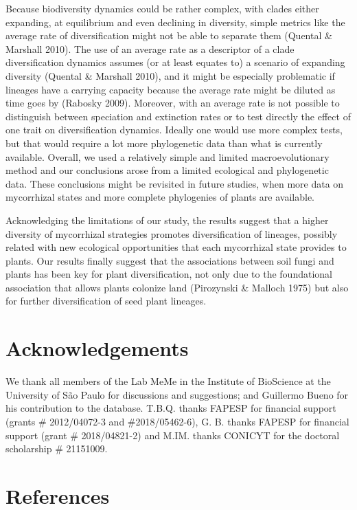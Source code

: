 \documentclass[12pt,]{article}
\begin{document}
Because biodiversity dynamics could be rather complex, with clades
either expanding, at equilibrium and even declining in diversity, simple
metrics like the average rate of diversification might not be able to
separate them (Quental \& Marshall 2010). The use of an average rate as
a descriptor of a clade diversification dynamics assumes (or at least
equates to) a scenario of expanding diversity (Quental \& Marshall
2010), and it might be especially problematic if lineages have a
carrying capacity because the average rate might be diluted as time goes
by (Rabosky 2009). Moreover, with an average rate is not possible to
distinguish between speciation and extinction rates or to test directly
the effect of one trait on diversification dynamics. Ideally one would
use more complex tests, but that would require a lot more phylogenetic
data than what is currently available. Overall, we used a relatively
simple and limited macroevolutionary method and our conclusions arose
from a limited ecological and phylogenetic data. These conclusions might
be revisited in future studies, when more data on mycorrhizal states and
more complete phylogenies of plants are available.

Acknowledging the limitations of our study, the results suggest that a
higher diversity of mycorrhizal strategies promotes diversification of
lineages, possibly related with new ecological opportunities that each
mycorrhizal state provides to plants. Our results finally suggest that
the associations between soil fungi and plants has been key for plant
diversification, not only due to the foundational association that
allows plants colonize land (Pirozynski \& Malloch 1975) but also for
further diversification of seed plant lineages.

\hypertarget{acknowledgements}{%
\section{Acknowledgements}\label{acknowledgements}}

We thank all members of the Lab MeMe in the Institute of BioScience at
the University of São Paulo for discussions and suggestions; and
Guillermo Bueno for his contribution to the database. T.B.Q. thanks
FAPESP for financial support (grants \# 2012/04072-3 and
\#2018/05462-6), G. B. thanks FAPESP for financial support (grant \#
2018/04821-2) and M.IM. thanks CONICYT for the doctoral scholarship \#
21151009.

\hypertarget{references}{%
\section{References}\label{references}}
\end{document}
